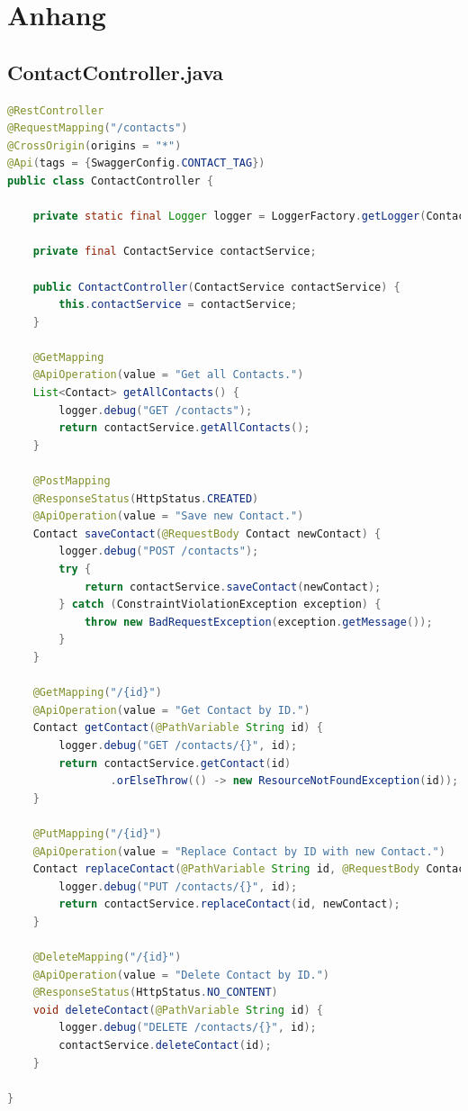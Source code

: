 \section*{Anhang}
\label{anhang}

\appendix

\subsection*{ContactController.java}

\begin{lstlisting}[language=java]
@RestController
@RequestMapping("/contacts")
@CrossOrigin(origins = "*")
@Api(tags = {SwaggerConfig.CONTACT_TAG})
public class ContactController {

    private static final Logger logger = LoggerFactory.getLogger(ContactApplication.class);

    private final ContactService contactService;

    public ContactController(ContactService contactService) {
        this.contactService = contactService;
    }

    @GetMapping
    @ApiOperation(value = "Get all Contacts.")
    List<Contact> getAllContacts() {
        logger.debug("GET /contacts");
        return contactService.getAllContacts();
    }

    @PostMapping
    @ResponseStatus(HttpStatus.CREATED)
    @ApiOperation(value = "Save new Contact.")
    Contact saveContact(@RequestBody Contact newContact) {
        logger.debug("POST /contacts");
        try {
            return contactService.saveContact(newContact);
        } catch (ConstraintViolationException exception) {
            throw new BadRequestException(exception.getMessage());
        }
    }

    @GetMapping("/{id}")
    @ApiOperation(value = "Get Contact by ID.")
    Contact getContact(@PathVariable String id) {
        logger.debug("GET /contacts/{}", id);
        return contactService.getContact(id)
                .orElseThrow(() -> new ResourceNotFoundException(id));
    }

    @PutMapping("/{id}")
    @ApiOperation(value = "Replace Contact by ID with new Contact.")
    Contact replaceContact(@PathVariable String id, @RequestBody Contact newContact) {
        logger.debug("PUT /contacts/{}", id);
        return contactService.replaceContact(id, newContact);
    }

    @DeleteMapping("/{id}")
    @ApiOperation(value = "Delete Contact by ID.")
    @ResponseStatus(HttpStatus.NO_CONTENT)
    void deleteContact(@PathVariable String id) {
        logger.debug("DELETE /contacts/{}", id);
        contactService.deleteContact(id);
    }

}
\end{lstlisting}

